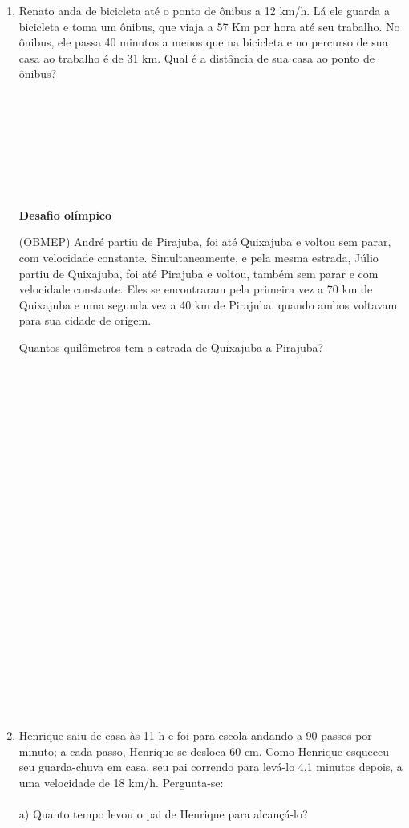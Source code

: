 \documentclass[a4paper,14pt]{article}
\begin{document}
\begin{multicols}{2}
\begin{enumerate}
    		\item Renato anda de bicicleta até o ponto de ônibus a 12 km/h. Lá ele guarda a bicicleta e toma um ônibus, que viaja a 57 Km por hora até seu trabalho. No ônibus, ele passa 40 minutos a menos que na bicicleta e no percurso de sua casa ao trabalho é de 31 km. Qual é a distância de sua casa ao ponto de ônibus? \\\\\\\\\\\\\\\\\\
    		
    		\textbf{Desafio olímpico}
    		
    		(OBMEP) André partiu de Pirajuba, foi até Quixajuba e voltou sem parar, com velocidade constante. Simultaneamente, e pela mesma estrada, Júlio partiu de Quixajuba, foi até Pirajuba e voltou, também sem parar e com velocidade constante. Eles se encontraram pela primeira vez a 70 km de Quixajuba e uma segunda vez a 40 km de Pirajuba, quando ambos voltavam para sua cidade de origem. 
    		
    		Quantos quilômetros tem a estrada de Quixajuba a Pirajuba?\\\\\\\\\\\\\\\\\\\\\\\\\\\\\\\\\\\\\\\\\\\\\\\\
    		
    		\item Henrique saiu de casa às 11 h e foi para escola andando a 90 passos por minuto; a cada passo, Henrique se desloca 60 cm. Como Henrique esqueceu seu guarda-chuva em casa, seu pai correndo para levá-lo 4,1 minutos depois, a uma velocidade de 18 km/h. Pergunta-se: \\\\
    		a) Quanto tempo levou o pai de Henrique para alcançá-lo? 
\\\\\\\\\\\\\\\\\\
    		

\end{enumerate}
\end{multicols}
\end{document}
